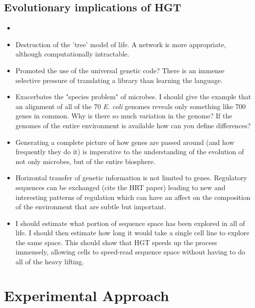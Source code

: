 \subsection*{Evolutionary implications of HGT}
\begin{itemize}
	\item 	
	\item Destruction of the 'tree' model of life. A network is more
		appropriate, although computationally intractable.
	\item Promoted the use of the universal genetic code? There is an
		immense selective pressure of translating a library than
		learning the language. 
	\item Exacerbates the "species problem" of microbes. I should give the
		example that an alignment of all of the 70 \textit{E. coli}
		genomes reveals only something like 700 genes in common. Why is
		there so much variation in the genome? If the genomes of the
		entire environment is available how can you define differences?
	\item Generating a complete picture of how genes are passed around (and
		how frequently they do it) is imperative to the understanding of
		the evolution of not only microbes, but of the entire biosphere. 
	\item Horizontal transfer of genetic information is not limited to
		genes. Regulatory sequences can be exchanged (cite the HRT
		paper) leading to new and interesting patterns of regulation
		which can have an affect on the composition of the environment
		that are subtle but important.
	\item I should estimate what portion of sequence space has been explored
		in all of life. I should then estimate how long it would take a
		single cell line to explore the same space. This should show
		that HGT speeds up the process immensely, allowing cells to
		speed-read sequence space without having to do all  of the heavy
		lifting.
\end{itemize}
\section*{Experimental Approach}
